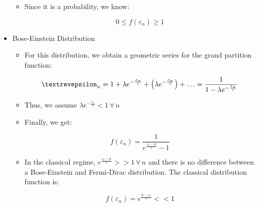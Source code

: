\begin{itemize}
\begin{itemize}
      \item Since it is a probability, we know:

        $$0\leq f(\varepsilon_n)\geq 1$$

    \end{itemize}

  \item Bose-Einstein Distribution

    \begin{itemize}

      \item For this distribution, we obtain a geometric series for the grand partition function:

        $$\text{\textrevepsilon}_n=1+\lambda e^{-\frac{\varepsilon_n}{\tau}}+\left( \lambda e^{-\frac{\varepsilon_n}{\tau}} \right)+\ldots=\frac{1}{1-\lambda e^{-\frac{\varepsilon_n}{\tau}}}$$

      \item Thus, we assume $\lambda e^{-\frac{\varepsilon_n}{\tau}}< 1\,\forall\,n$

      \item Finally, we get:

        $$f(\varepsilon_n)=\frac{1}{e^{\frac{\varepsilon_n-\mu}{\tau}}-1}$$

      \item In the classical regime, $e^{\frac{\varepsilon_n-\mu}{\tau}}>>1\,\forall\,n$ and there is no difference between a Bose-Einstein and Fermi-Dirac distribution. The classical distribution function is:

        $$f(\varepsilon_n)=e^{\frac{\mu-\varepsilon_n}{\tau}}<<1$$

    \end{itemize}

\end{itemize}





